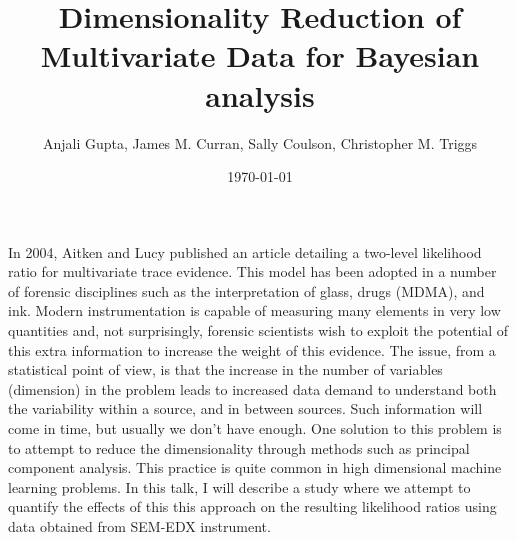 \documentclass{article}
\title{Dimensionality Reduction of Multivariate Data for Bayesian analysis}
\author{Anjali Gupta, James M. Curran, Sally Coulson, Christopher M. Triggs}
\date{\today}
\begin{document}
	\maketitle
	In 2004, Aitken and Lucy published an article detailing a two-level likelihood ratio for multivariate trace evidence. This model has been adopted in a number of forensic disciplines such as the interpretation of glass, drugs (MDMA), and ink. Modern instrumentation is capable of measuring many elements in very low quantities and, not surprisingly, forensic scientists wish to exploit the potential of this extra information to increase the weight of this evidence. The issue, from a statistical point of view, is that the increase in the number of variables (dimension) in the problem leads to increased data demand to understand both the variability within a source, and in between sources. Such information will come in time, but usually we don’t have enough. One solution to this problem is to attempt to reduce the dimensionality through methods such as principal component analysis. This practice is quite common in high dimensional machine learning problems. In this talk, I will describe a study where we attempt to quantify the effects of this this approach on the resulting likelihood ratios using data obtained from SEM-EDX instrument.
	
%	
%	
\end{document}
